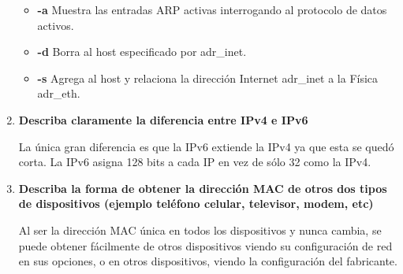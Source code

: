 \documentclass[a4paper,12pt]{article}
\begin{document}
\begin{enumerate}
 \begin{itemize}
  \item \textbf{-a} Muestra las entradas ARP activas interrogando al protocolo de datos activos.
  \item \textbf{-d} Borra al host especificado por adr\_inet.
  \item \textbf{-s} Agrega al host y relaciona la dirección Internet adr\_inet a la Física adr\_eth.
 \end{itemize}
 
 \item \textbf{Describa claramente la diferencia entre IPv4 e IPv6}
 
 La única gran diferencia es que la IPv6 extiende la IPv4 ya que esta se quedó corta. La IPv6 asigna 128 bits a cada IP
 en vez de sólo 32 como la IPv4.
 
 \item \textbf{Describa la forma de obtener la dirección MAC de otros dos tipos de dispositivos (ejemplo teléfono celular, televisor, modem, etc)}
 
 Al ser la dirección MAC única en todos los dispositivos y nunca cambia, se puede obtener fácilmente de otros dispositivos
 viendo su configuración de red en sus opciones, o en otros dispositivos, viendo la configuración del fabricante.
 


 
 
 
\end{enumerate}
\end{document}
